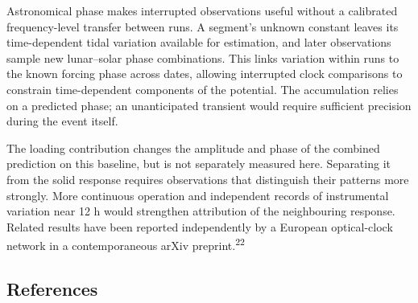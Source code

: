 \documentclass[
  12pt,
  a4paper,
]{article}
\begin{document}
Astronomical phase makes interrupted observations useful without a
calibrated frequency-level transfer between runs. A segment's unknown
constant leaves its time-dependent tidal variation available for
estimation, and later observations sample new lunar--solar phase
combinations. This links variation within runs to the known forcing
phase across dates, allowing interrupted clock comparisons to constrain
time-dependent components of the potential. The accumulation relies on a
predicted phase; an unanticipated transient would require sufficient
precision during the event itself.

The loading contribution changes the amplitude and phase of the combined
prediction on this baseline, but is not separately measured here.
Separating it from the solid response requires observations that
distinguish their patterns more strongly. More continuous operation and
independent records of instrumental variation near 12 h would strengthen
attribution of the neighbouring response. Related results have been
reported independently by a European optical-clock network in a
contemporaneous arXiv preprint.\textsuperscript{22}

\clearpage

\singlespacing\fontsize{11}{13}\selectfont

\hypertarget{references}{%
\subsection{References}\label{references}}
\end{document}
